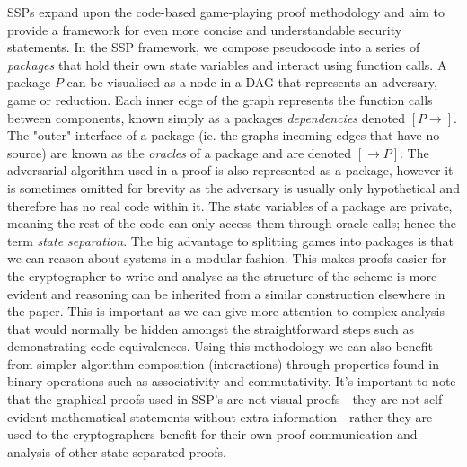 \documentclass[bsc,frontabs,singlespacing,parskip,deptreport]{infthesis}
\begin{document}
SSPs expand upon the code-based game-playing proof methodology and aim to provide a framework for even more concise and understandable security statements. In the SSP framework, we compose pseudocode into a series of \textit{packages} that hold their own state variables and interact using function calls. A package $P$ can be visualised as a node in a DAG that represents an adversary, game or reduction. Each inner edge of the graph represents the function calls between components, known simply as a packages \textit{dependencies} denoted $[P\rightarrow]$. The "outer" interface of a package (ie. the graphs incoming edges that have no source) are known as the \textit{oracles} of a package and are denoted $[\rightarrow P]$. The adversarial algorithm used in a proof is also represented as a package, however it is sometimes omitted for brevity as the adversary is usually only hypothetical and therefore has no real code within it. The state variables of a package are private, meaning the rest of the code can only access them through oracle calls; hence the term \textit{state separation}. The big advantage to splitting games into packages is that we can reason about systems in a modular fashion. This makes proofs easier for the cryptographer to write and analyse as the structure of the scheme is more evident and reasoning can be inherited from a similar construction elsewhere in the paper. This is important as we can give more attention to complex analysis that would normally be hidden amongst the straightforward steps such as demonstrating code equivalences. Using this methodology we can also benefit from simpler algorithm composition (interactions) through properties found in binary operations such as associativity and commutativity. It's important to note that the graphical proofs used in SSP's are not visual proofs - they are not self evident mathematical statements without extra information - rather they are used to the cryptographers benefit for their own proof communication and analysis of other state separated proofs.  
\end{document}
